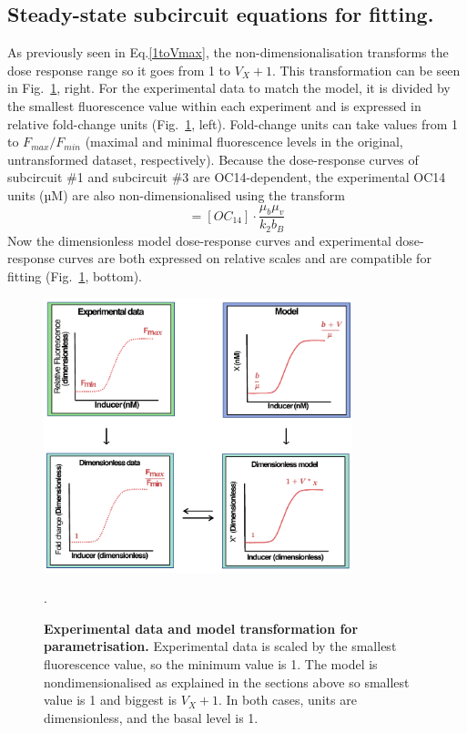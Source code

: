 \subsection{Steady-state subcircuit equations for fitting.}
As previously seen in Eq.\ref{1toVmax}, the non-dimensionalisation transforms the dose response range so it goes from 1 to $V_{X}+1$. This transformation can be seen in Fig.~\ref{fig:dose_response_transforms}, right.
For the experimental data to match the model, it is divided by the smallest fluorescence value within each experiment and is expressed in relative fold-change units (Fig.~\ref{fig:dose_response_transforms}, left).
Fold-change units can take values from 1 to $F_{max}/F_{min}$ (maximal and minimal fluorescence levels in the original, untransformed dataset, respectively).
Because the dose-response curves of subcircuit \#1 and subcircuit \#3 are OC14-dependent, the experimental OC14 units (µM) are also non-dimensionalised using the transform
\begin{equation}
    [B*]=[OC_{14}] \cdot \frac{\mu_{b}\mu_{v}}{k_{2}b_{B}}
    \label{Btransform}
\end{equation}
Now the dimensionless model dose-response curves and experimental dose-response curves are both expressed on relative scales and are compatible for fitting (Fig.~\ref{fig:dose_response_transforms}, bottom).
\begin{figure}[H] %
    \centering
    \begin{adjustbox}{center}
        \includegraphics[width=0.8\textwidth]{chapters/Chapter 2/dose_response_transforms}
    \end{adjustbox}
    \caption{\textbf{Experimental data and model transformation for parametrisation.} Experimental data is scaled by the smallest fluorescence value, so the minimum value is 1. The model is nondimensionalised as explained in the sections above so smallest value is 1 and biggest is $V_{X} +1$. In both cases, units are dimensionless, and the basal level is 1.}.
    \label{fig:dose_response_transforms}
\end{figure}


